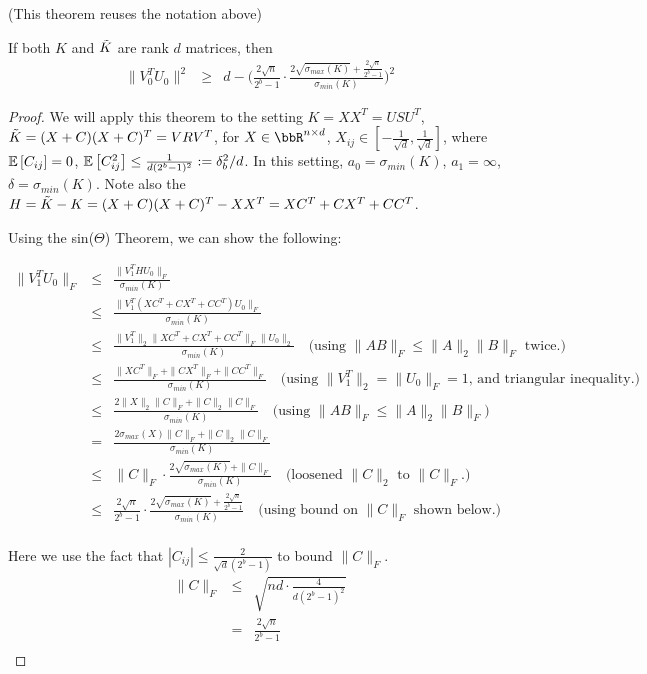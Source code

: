 (This theorem reuses the notation above)
\begin{theorem}
If both $K$ and $\tK$ are rank $d$ matrices, then
\begin{eqnarray*}
\|V_0^T U_0\|^2 &\geq& d - \Bigg(\frac{2\sqrt{n}}{2^b-1} \cdot \frac{2\sqrt{\sigma_{max}(K)} + \frac{2\sqrt{n}}{2^b-1} }{\sigma_{min}(K)} \Bigg)^2
\end{eqnarray*}
\end{theorem}
\begin{proof}
We will apply this theorem to the setting $K = XX^T = USU^T$, $\tK = (X+C)(X+C)^T = VRV^T$,
for $X \in \RR^{n \times d}$, $X_{ij}\in [-\frac{1}{\sqrt{d}},\frac{1}{\sqrt{d}}]$,
where $\expect{}{C_{ij}} = 0$, $\expect{}{C_{ij}^2} \leq \frac{1}{d(2^b-1)^2} \defeq \delta_b^2/d$.
In this setting, $a_0 = \sigma_{min}(K)$, $a_1 = \infty$, $\delta=\sigma_{min}(K)$.
Note also the $H = \tK-K = (X+C)(X+C)^T - XX^T = XC^T + CX^T + CC^T$.

Using the sin($\Theta$) Theorem, we can show the following:

\begin{eqnarray*}
\|V_1^T U_0\|_F &\leq& \frac{\|V_1^T H U_0\|_F}{\sigma_{min}(K)}\\
&\leq& \frac{\|V_1^T (XC^T + CX^T + CC^T) U_0\|_F}{\sigma_{min}(K)}\\
&\leq& \frac{\|V_1^T\|_2 \|XC^T + CX^T + CC^T\|_F \|U_0\|_2}{\sigma_{min}(K)} \quad \text{(using $\|AB\|_F \leq \|A\|_2 \|B\|_F$ twice.)}\\
&\leq& \frac{\|XC^T\|_F + \|CX^T\|_F + \|CC^T\|_F}{\sigma_{min}(K)} \quad \text{(using $\|V_1^T\|_2 = \|U_0\|_F = 1$, and triangular inequality.)}\\
&\leq& \frac{2\|X\|_2\|C\|_F + \|C\|_2 \|C\|_F}{\sigma_{min}(K)} \quad \text{(using $\|AB\|_F \leq \|A\|_2 \|B\|_F$)}\\
&=& \frac{2\sigma_{max}(X)\|C\|_F + \|C\|_2 \|C\|_F}{\sigma_{min}(K)} \\
&\leq& \|C\|_F \cdot \frac{2\sqrt{\sigma_{max}(K)} + \|C\|_F }{\sigma_{min}(K)}  \quad \text{(loosened $\|C\|_2$ to  $\|C\|_F$.)}\\
&\leq& \frac{2\sqrt{n}}{2^b-1} \cdot \frac{2\sqrt{\sigma_{max}(K)} + \frac{2\sqrt{n}}{2^b-1} }{\sigma_{min}(K)} \quad \text{(using bound on $\|C\|_F$ shown below.)} \\
\end{eqnarray*}

Here we use the fact that $|C_{ij}| \leq \frac{2}{\sqrt{d}(2^b-1)}$ to bound $\|C\|_F$.
\begin{eqnarray*}
\|C\|_F &\leq& \sqrt{nd \cdot \frac{4}{d(2^b-1)^2}} \\
&=& \frac{2\sqrt{n}}{2^b-1} \\
\end{eqnarray*}


\end{proof}
